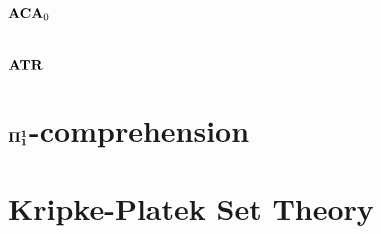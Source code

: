 \documentclass[8pt]{article}
\theoremstyle{definition}
\theoremstyle{definition}
\theoremstyle{definition}
\theoremstyle{definition}
\theoremstyle{definition}
\theoremstyle{definition}
\theoremstyle{definition}
\theoremstyle{definition}
\theoremstyle{definition}
\theoremstyle{definition}
\theoremstyle{definition}
\theoremstyle{definition}
\theoremstyle{definition}
\theoremstyle{question}
\begin{document}
\section{${\bf ACA}_0$}

\section{${\bf ATR}$}

\section{${\bf \Pi_1^1}$-comprehension}

\section{Kripke-Platek Set Theory}




\end{document}
